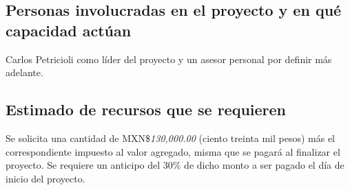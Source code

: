 \documentclass[11pt,letterpaper,spanish]{article}
\begin{document}
\subsection*{Personas involucradas en el proyecto y en qué capacidad actúan}

Carlos Petricioli como líder del proyecto y un asesor personal por definir más adelante. 

\subsection*{Estimado de recursos que se requieren}

Se solicita una cantidad de MXN\$\textit{130,000.00} (ciento treinta mil pesos) más el correspondiente  impuesto al valor agregado, misma que se pagará al finalizar el proyecto. Se requiere un anticipo del 30\% de dicho monto a ser pagado el día de inicio del proyecto.

\label{LastPage}
\end{document}
